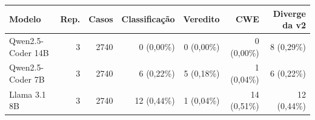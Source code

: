 \begin{tabular}{lrrrrrr}
\hline
Modelo & Rep. & Casos & Classificação & Veredito & CWE & Diverge da v2 \\
\hline
Qwen2.5-Coder 14B & 3 & 2740 & 0 (0,00\%) & 0 (0,00\%) & 0 (0,00\%) & 8 (0,29\%) \\
Qwen2.5-Coder 7B & 3 & 2740 & 6 (0,22\%) & 5 (0,18\%) & 1 (0,04\%) & 6 (0,22\%) \\
Llama 3.1 8B & 3 & 2740 & 12 (0,44\%) & 1 (0,04\%) & 14 (0,51\%) & 12 (0,44\%) \\
\hline
\end{tabular}
